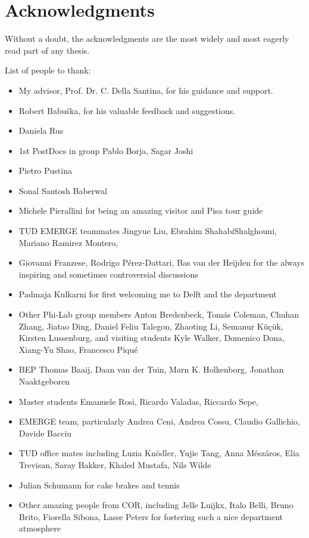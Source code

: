 \chapter*{Acknowledgments}

Without a doubt, the acknowledgments are the most widely and most
eagerly read part of any thesis.

List of people to thank:
\begin{itemize}
    \item My advisor, Prof. Dr. C. Della Santina, for his guidance and support.
    \item Robert Babuška, for his valuable feedback and suggestions.
    \item Daniela Rus
    \item 1st PostDocs in group Pablo Borja, Sagar Joshi
    \item Pietro Pustina
    \item Sonal Santosh Baberwal
    \item Michele Pierallini for being an amazing visitor and Pisa tour guide
    \item TUD EMERGE teammates Jingyue Liu, Ebrahim ShahabiShalghouni, Mariano Ramirez Montero,
    \item Giovanni Franzese, Rodrigo Pérez-Dattari, Bas van der Heijden for the always inspiring and sometimes controversial discussions
    \item Padmaja Kulkarni for first welcoming me to Delft and the department
    \item Other Phi-Lab group members Anton Bredenbeck, Tomás Coleman, Chuhan Zhang, Jiatao Ding, Daniel Feliu Talegon, Zhaoting Li, Semanur Küçük, Kirsten Lussenburg, and visiting students Kyle Walker, Domenico Dona, Xiang-Yu Shao, Francesco Piqué
    \item BEP Thomas Baaij, Daan van der Tuin, Marn K. Holkenborg, Jonathan Naaktgeboren
    \item Master students Emanuele Rosi, Ricardo Valadas, Riccardo Sepe, 
    \item EMERGE team, particularly Andrea Ceni, Andrea Cossu, Claudio Gallichio, Davide Bacciu
    \item TUD office mates including Luzia Knödler, Yujie Tang, Anna Mészáros, Elia Trevisan, Saray Bakker, Khaled Mustafa, Nils Wilde
    \item Julian Schumann for cake brakes and tennis
    \item Other amazing people from COR, including Jelle Luijkx, Italo Belli, Bruno Brito, Fiorella Sibona, Lasse Peters for fostering such a nice department atmosphere

\end{itemize}
